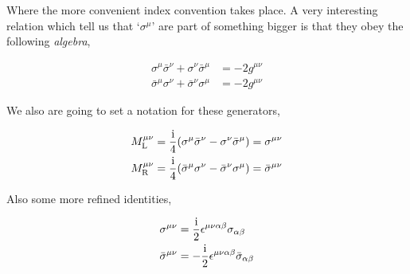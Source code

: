 Where the more convenient index convention takes place. A very interesting relation which tell us that `$\sigma^\mu$' are part of something bigger is that they obey the following \textit{algebra},

\begin{align}
    \sigma^\mu{\bar\sigma}^\nu+\sigma^\nu{\bar\sigma}^\mu&=-2g^{\mu\nu}\nonumber\\
    {\bar\sigma}^\mu\sigma^\nu+{\bar\sigma}^\nu\sigma^\mu&=-2g^{\mu\nu}\nonumber
\end{align}

We also are going to set a notation for these generators,

\begin{align}
    M_{\textnormal L}^{\mu\nu}&=\frac\im 4\qty(\tensor{\sigma}{^\mu}\tensor{{\bar\sigma}}{^\nu}-\tensor{\sigma}{^\nu}\tensor{{\bar\sigma}}{^\mu})=\sigma^{\mu\nu}\nonumber\\
    {M_{\textnormal R}^{\mu\nu}}&=\frac\im 4\qty(\tensor{{\bar\sigma}}{^\mu}\tensor{\sigma}{^\nu}-\tensor{{\bar\sigma}}{^\nu}\tensor{\sigma}{^\mu})={\bar\sigma}^{\mu\nu}\nonumber
\end{align}

Also some more refined identities,

\begin{align}
    \sigma^{\mu\nu}&=\frac{\textnormal{i}}2\epsilon^{\mu\nu\alpha\beta}\sigma_{\alpha\beta}\nonumber\\
    {\bar\sigma}^{\mu\nu}&=-\frac{\textnormal{i}}2\epsilon^{\mu\nu\alpha\beta}{\bar\sigma}_{\alpha\beta}\nonumber
\end{align}